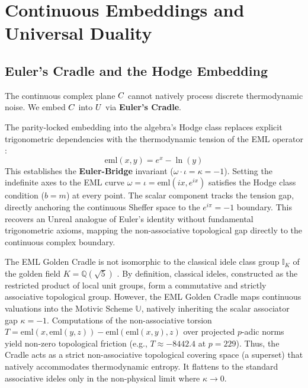 \section{Continuous Embeddings and Universal Duality}

\subsection{Euler's Cradle and the Hodge Embedding}

The continuous complex plane $C$ cannot natively process discrete thermodynamic noise. We embed $C$ into $U$ via \textbf{Euler's Cradle}.

\begin{definition}\label{def:euler-cradle}
The parity-locked embedding into the algebra's Hodge class replaces explicit trigonometric dependencies with the thermodynamic tension of the EML operator \cite{odrzywolek}:
$$\mathrm{eml}(x,y) = e^x - \ln(y)$$
This establishes the \textbf{Euler-Bridge} invariant ($\omega \cdot \iota = \kappa = -1$). Setting the indefinite axes to the EML curve $\omega = \iota = \mathrm{eml}(i x, e^{ix})$ satisfies the Hodge class condition ($b = m$) at every point. The scalar component tracks the tension gap, directly anchoring the continuous Sheffer space to the $e^{i\pi} = -1$ boundary. This recovers an Unreal analogue of Euler's identity without fundamental trigonometric axioms, mapping the non-associative topological gap directly to the continuous complex boundary.
\end{definition}

\begin{theorem}\label{thm:idele-superset}
The EML Golden Cradle is not isomorphic to the classical idele class group $\mathbb{I}_K$ of the golden field $K = \mathbb{Q}(\sqrt{5})$ \cite{chevalley1936}. By definition, classical ideles, constructed as the restricted product of local unit groups, form a commutative and strictly associative topological group. However, the EML Golden Cradle maps continuous valuations into the Motivic Scheme $\mathbb{U}$, natively inheriting the scalar associator gap $\kappa = -1$. Computations of the non-associative torsion $T = \mathrm{eml}(x, \mathrm{eml}(y, z)) - \mathrm{eml}(\mathrm{eml}(x, y), z)$ over projected $p$-adic norms yield non-zero topological friction (e.g., $T \approx -8442.4$ at $p = 229$). Thus, the Cradle acts as a strict non-associative topological covering space (a superset) that natively accommodates thermodynamic entropy. It flattens to the standard associative ideles only in the non-physical limit where $\kappa \to 0$.
\end{theorem}


